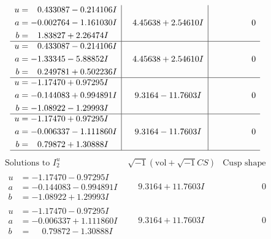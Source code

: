 \documentclass[1p]{elsarticle_modified}
\theoremstyle{definition}
\newcommand{\I}{\sqrt{-1}}
\begin{document}
$$\begin{array}{c|c|c}
\begin{aligned}
u &= \phantom{-}0.433087 - 0.214106 I \\
a &= -0.002764 - 1.161030 I \\
b &= \phantom{-}1.83827 + 2.26474 I\end{aligned}
 & \phantom{-}4.45638 + 2.54610 I & \phantom{-0.000000 } 0 \\ \hline\begin{aligned}
u &= \phantom{-}0.433087 - 0.214106 I \\
a &= -1.33345 - 5.88852 I \\
b &= \phantom{-}0.249781 + 0.502236 I\end{aligned}
 & \phantom{-}4.45638 + 2.54610 I & \phantom{-0.000000 } 0 \\ \hline\begin{aligned}
u &= -1.17470 + 0.97295 I \\
a &= -0.144083 + 0.994891 I \\
b &= -1.08922 - 1.29993 I\end{aligned}
 & \phantom{-}9.3164 - 11.7603 I & \phantom{-0.000000 } 0 \\ \hline\begin{aligned}
u &= -1.17470 + 0.97295 I \\
a &= -0.006337 - 1.111860 I \\
b &= \phantom{-}0.79872 + 1.30888 I\end{aligned}
 & \phantom{-}9.3164 - 11.7603 I & \phantom{-0.000000 } 0\\
 \hline 
 \end{array}$$\newpage$$\begin{array}{c|c|c}  
\text{Solutions to }I^u_{2}& \I (\text{vol} + \sqrt{-1}CS) & \text{Cusp shape}\\
 \hline 
\begin{aligned}
u &= -1.17470 - 0.97295 I \\
a &= -0.144083 - 0.994891 I \\
b &= -1.08922 + 1.29993 I\end{aligned}
 & \phantom{-}9.3164 + 11.7603 I & \phantom{-0.000000 } 0 \\ \hline\begin{aligned}
u &= -1.17470 - 0.97295 I \\
a &= -0.006337 + 1.111860 I \\
b &= \phantom{-}0.79872 - 1.30888 I\end{aligned}
 & \phantom{-}9.3164 + 11.7603 I & \phantom{-0.000000 } 0 \\ \hline\begin{aligned}

\end{aligned}
\end{array}$$
\end{document}
